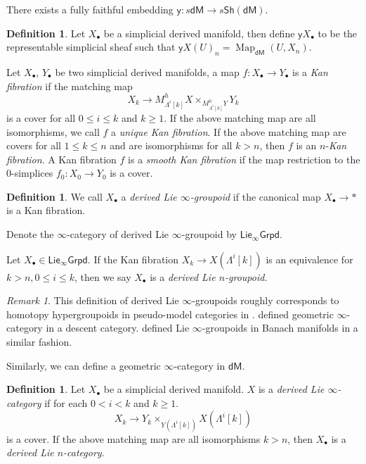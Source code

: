 \documentclass[12pt]{amsart}
\theoremstyle{definition}
\newtheorem{defn}[thm]{Definition}
\theoremstyle{remark}
\newtheorem{rem}[thm]{Remark}
\numberwithin{equation}{section}
\newcommand{\1}{{\mathbb{1}}}
\newcommand{\y}{\mathsf{y}}
\newcommand{\dm}{\mathsf{dM}}
\newcommand{\sh}{\mathsf{Sh}}
\newcommand{\ilgpd}{\mathsf{Lie_{\infty}Grpd}}
\newcommand{\bt}{\bullet}
\newcommand{\map}{\operatorname{Map}}
\begin{document}
There exists a fully faithful embedding $\y: s\dm\to s\sh(\dm)$.
\begin{defn}
	Let $X_{\bullet}$ be a simplicial derived manifold, then define $\y X_{\bullet}$ to be the representable simplicial sheaf such that $\y X(U)_n=\map_{\dm} (U,X_n)$.
\end{defn}



Let $X_{\bullet}$, $Y_{\bullet}$ be two simplicial derived manifolds, a map $f: X_{\bullet}\to Y_{\bullet}$ is a {\it Kan fibration} if the matching map
\begin{equation*}
X_k\to  M^h_{\Lambda^i[k]} X\times_{M^h_{\Lambda^i[k]}Y} Y_k
\end{equation*}
is a cover for all $0\le i \le k$ and $k\ge 1$. If the above matching map are all isomorphisms, we call $f$ a {\it unique Kan fibration}. If the above matching map are covers for all $1\le k \le n$ and are isomorphisms for all $k > n$, then $f$ is an $n$-{\it Kan fibration}. A Kan fibration $f$ is a {\it smooth Kan fibration} if the map restriction to the 0-simplices $f_0: X_0 \to Y_0$ is a cover.

\begin{defn}
    We call $X_{\bullet}$ a {\it derived Lie $\infty$-groupoid} if the canonical map $ X_{\bullet}\to \ast$ is a Kan fibration.
\end{defn}
Denote the $\infty$-category of derived Lie $\infty$-groupoid by $\ilgpd$. 



Let $X_{\bullet}\in \ilgpd$. If the Kan fibration $X_k \to X(\Lambda^i[k])$ is an equivalence for $k> n, 0\le i \le k$, then we say $X_{\bullet}$ is a {\it derived Lie $n$-groupoid}.

\begin{rem}
    This definition of derived Lie $\infty$-groupoids roughly corresponds to homotopy hypergroupoids in pseudo-model categories in \cite{Pri13}. \cite{BG17} defined geometric $\infty$-category in a descent category. \cite{RZ20} defined Lie $\infty$-groupoids in Banach manifolds in a similar fashion. 
\end{rem}



Similarly, we can define a geometric $\infty$-category in $\dm$.
\begin{defn}
    Let $X_{\bullet}$ be a simplicial derived manifold. $X$ is a {\it derived Lie $\infty$-category} if for each $0<i<k$ and $k\ge 1$.
    $$ X_k\to Y_k \times_{Y(\Lambda^i[k])} X(\Lambda^i[k]) $$ is a cover. If the above matching map are all isomorphisms $k > n$, then $X_{\bt}$ is a {\it derived Lie $n$-category}.
\end{defn}
\end{document}
